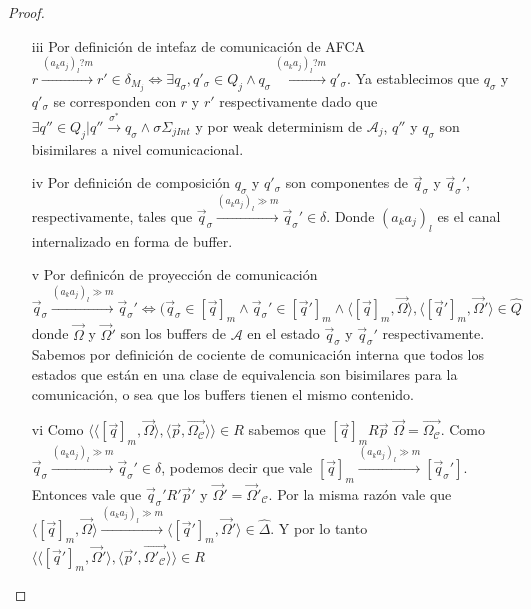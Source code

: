 \begin{proof}
\begin{itemize}
    \item[iii] Por definición de intefaz de comunicación de AFCA $r \xrightarrow{(a_ka_j)_l?m} r' \in \delta_{M_j} \iff \exists q_{\sigma},q'_{\sigma} \in Q_j \land q_{\sigma} \xrightarrow{(a_ka_j)_l?m} q'_{\sigma}$. Ya establecimos que $q_{\sigma}$ y $q'_{\sigma}$ se corresponden con $r$ y $r'$ respectivamente dado que $\exists q'' \in Q_j | q'' \xrightarrow{\sigma^*} q_{\sigma} \land \sigma \Sigma_{jInt}$ y por weak determinism de $\mathcal{A}_j$, $q''$ y $q_{\sigma}$ son bisimilares a nivel comunicacional.
    
    \item[iv] Por definición de composición $q_{\sigma}$ y $q'_{\sigma}$ son componentes de $\overrightarrow{q}_{\sigma}$ y $\overrightarrow{q}_{\sigma}'$, respectivamente, tales que $ \overrightarrow{q}_{\sigma} \xrightarrow{(a_ka_j)_l \gg m} \overrightarrow{q}_{\sigma}' \in \delta$. Donde $(a_ka_j)_l$ es el canal internalizado en forma de buffer.
    
    \item[v] Por definicón de proyección de comunicación $\overrightarrow{q}_{\sigma} \xrightarrow{(a_ka_j)_l \gg m} \overrightarrow{q}_{\sigma}' \iff (\overrightarrow{q}_{\sigma} \in [\overrightarrow{q}]_m \land \overrightarrow{q}_{\sigma}' \in [\overrightarrow{q}']_m \land \langle [\overrightarrow{q}]_m, \overrightarrow{\Omega} \rangle, \langle [\overrightarrow{q}']_m, \overrightarrow{\Omega}' \rangle \in \hat{Q}$ donde $\overrightarrow{\Omega}$ y $\overrightarrow{\Omega}'$ son los buffers de $\mathcal{A}$ en el estado $\overrightarrow{q}_{\sigma}$ y $\overrightarrow{q}_{\sigma}'$ respectivamente. Sabemos por definición de cociente de comunicación interna que todos los estados que están en una clase de equivalencia son bisimilares para la comunicación, o sea que los buffers tienen el mismo contenido. 
        
    \item[vi] Como $\langle \langle [\overrightarrow{q}]_m, \overrightarrow{\Omega} \rangle, \langle \overrightarrow{p}, \overrightarrow{\Omega_\mathcal{C}} \rangle \rangle \in R$ sabemos que $[\overrightarrow{q}]_mR\overrightarrow{p}$ $\overrightarrow{\Omega}=\overrightarrow{\Omega_\mathcal{C}}$. Como $\overrightarrow{q}_{\sigma} \xrightarrow{(a_ka_j)_l \gg m} \overrightarrow{q}_{\sigma}' \in \delta$, podemos decir que vale $[\overrightarrow{q}]_m \xrightarrow{(a_ka_j)_l \gg m} [\overrightarrow{q}_{\sigma}']$. Entonces vale que $\overrightarrow{q}_{\sigma}'R'\overrightarrow{p}'$ y $\overrightarrow{\Omega}' = \overrightarrow{\Omega}'_\mathcal{C}$. Por la misma razón vale que $\langle [\overrightarrow{q}]_m, \overrightarrow{\Omega} \rangle \xrightarrow{(a_ka_j)_l \gg m} \langle [\overrightarrow{q}']_m, \overrightarrow{\Omega}' \rangle \in \hat{\Delta}$. Y por lo tanto $\langle \langle [\overrightarrow{q}']_m, \overrightarrow{\Omega}' \rangle, \langle \overrightarrow{p}', \overrightarrow{\Omega'_\mathcal{C}} \rangle \rangle \in R$
    

\end{itemize}
\end{proof}
